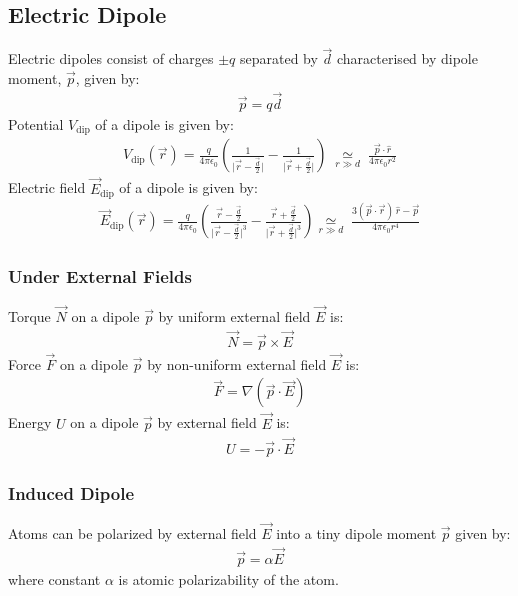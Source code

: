 \documentclass[12pt, a4paper]{article}
\begin{document}
\begin{multicols*}{3}
\colbreak
\subsection{Electric Dipole}
Electric dipoles consist of charges $\pm q$ separated by $\vec{d}$ characterised by dipole moment, $\vec{p}$, given by:
\begin{align*}
  \vec{p} = q \vec{d}
\end{align*}
Potential $V_{\text{dip}}$ of a dipole is given by:
\begin{align*}
  V_{\text{dip}}(\vec r) = \frac{q}{4\pi\epsilon_0}\left(\frac{1}{\big|\vec r-\frac{\vec d}{2}\big|} -\frac{1}{\big|\vec r+\frac{\vec{d}}{2}\big|}\right) 
  \;\underset{r\gg d}{\simeq}\; \frac{\vec{p}\cdot \hat{r}}{4\pi\epsilon_0r^2}
\end{align*}
Electric field $\vec{E}_{\text{dip}}$ of a dipole is given by:
\begin{align*}
  \vec E_{\text{dip}}(\vec r) = \frac{q}{4\pi\epsilon_0}\left(
\frac{\vec r- \frac{\vec{d}}{2}}{\big|\vec r-\frac{\vec{d}}{2}\big|^{3}}
-\frac{\vec r+ \frac{\vec{d}}{2}}{\big|\vec r+ \frac{\vec{d}}{2}\big|^{3}}
\right)
\underset{r\gg d}{\simeq}\; \frac{3(\vec p\!\cdot\!\vec{r})\,\hat r-\vec p}{4\pi\epsilon_0r^4}
\end{align*}

\subsubsection{Under External Fields}
Torque $\vec{N}$ on a dipole $\vec{p}$ by uniform external field $\vec{E}$ is:
\begin{align*}
  \vec{N} = \vec{p} \times \vec{E} 
\end{align*}
Force $\vec{F}$ on a dipole $\vec{p}$ by non-uniform external field $\vec{E}$ is:
\begin{align*}
  \vec{F} = \nabla(\vec{p}\cdot \vec{E})
\end{align*}
Energy $U$ on a dipole $\vec{p}$ by external field $\vec{E}$ is:
\begin{align*}
  U = -\vec{p}\cdot \vec{E}
\end{align*}

\subsubsection{Induced Dipole}
Atoms can be polarized by external field $\vec{E}$ into a tiny dipole moment $\vec{p}$ given by:
\begin{align*}
  \vec{p} = \alpha \vec{E}
\end{align*}
where constant $\alpha$ is atomic polarizability of the atom.


\end{multicols*}
\end{document}
